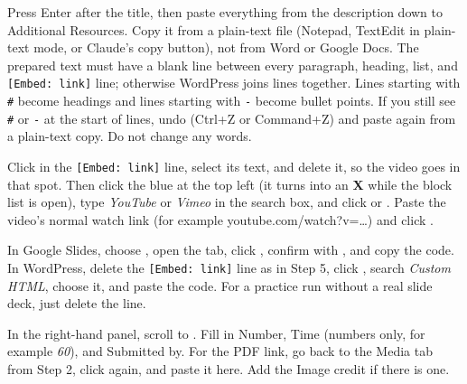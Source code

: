 Press Enter after the title, then paste everything from the description down to Additional Resources. Copy it from a plain-text file (Notepad, TextEdit in plain-text mode, or Claude's copy button), not from Word or Google Docs. The prepared text must have a blank line between every paragraph, heading, list, and \texttt{[Embed: link]} line; otherwise WordPress joins lines together. Lines starting with \texttt{\#} become headings and lines starting with \texttt{-} become bullet points. If you still see \texttt{\#} or \texttt{-} at the start of lines, undo (Ctrl+Z or Command+Z) and paste again from a plain-text copy. Do not change any words.

Click in the \texttt{[Embed: link]} line, select its text, and delete it, so the video goes in that spot. Then click the blue \menu{+} at the top left (it turns into an \textbf{X} while the block list is open), type \textit{YouTube} or \textit{Vimeo} in the search box, and click  or . Paste the video's normal watch link (for example youtube.com/watch?v=\ldots) and click .

In Google Slides, choose , open the  tab, click , confirm with , and copy the code. In WordPress, delete the \texttt{[Embed: link]} line as in Step 5, click \menu{+}, search \textit{Custom HTML}, choose it, and paste the code. For a practice run without a real slide deck, just delete the line.

In the right-hand panel, scroll to . Fill in Number, Time (numbers only, for example \textit{60}), and Submitted by. For the PDF link, go back to the Media tab from Step 2, click  again, and paste it here. Add the Image credit if there is one.

